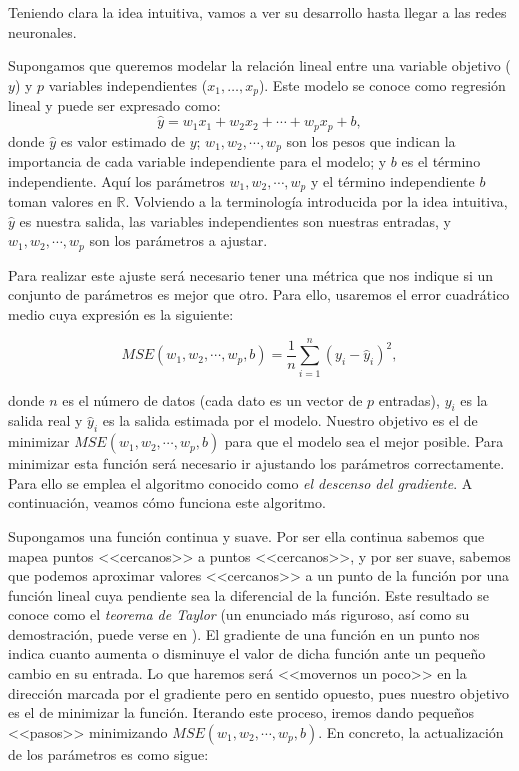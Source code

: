\documentclass[12pt, a4paper, twoside]{book}
\numberwithin{equation}{section}
\theoremstyle{definition}
\theoremstyle{remark}
\theoremstyle{plain}
\begin{document}
	Teniendo clara la idea intuitiva, vamos a ver su desarrollo hasta 
	llegar a las redes neuronales.

	Supongamos que queremos modelar la relación lineal entre una variable
	objetivo ($y$) y $p$ variables independientes ($x_{1},\dots,x_{p}$). 
	Este modelo se conoce como regresión lineal y puede ser expresado 
	como:
	\begin{equation*}
		\hat{y}=w_{1}x_{1}+w_{2}x_{2}+\cdots+w_{p}x_{p}+b,
	\end{equation*}
	donde $\hat{y}$ es valor estimado de $y$; $w_{1},w_{2},\cdots,w_{p}$ 
	son los pesos que indican la importancia de cada variable 
	independiente para el modelo; y $b$ es el término independiente. Aquí 
	los parámetros $w_{1},w_{2},\cdots,w_{p}$ y el término independiente 
	$b$ toman valores en $\mathbb{R}$.
	Volviendo a la terminología introducida por la idea intuitiva, 
	$\hat{y}$ es nuestra salida, las 
	variables independientes son nuestras entradas, y $w_{1},w_{2},\cdots,
	w_{p}$ son los parámetros a ajustar. 

	Para realizar este ajuste será necesario tener una métrica que nos 
	indique si un conjunto de parámetros es mejor que otro. Para ello,
	usaremos el error cuadrático medio cuya expresión es la siguiente:

	\begin{equation*}
		MSE(w_{1},w_{2},\cdots,w_{p},b)=\frac{1}{n}\sum_{i=1}^{n}(y_{i}-\hat{y}_{i})^2,
	\end{equation*}

	\noindent donde $n$ es el número de datos (cada dato es un vector de $p$ 
	entradas), $y_{i}$ es la salida real y 
	$\hat{y}_{i}$ es la salida estimada por el modelo. Nuestro objetivo
	es el de minimizar $MSE(w_{1},w_{2},\cdots,w_{p},b)$ para que el modelo 
	sea el mejor posible. 
	Para minimizar esta función será necesario ir ajustando los parámetros 
	correctamente. Para ello se emplea el algoritmo conocido como 
	\emph{el descenso del gradiente}. A continuación, veamos cómo funciona 
	este algoritmo.

	Supongamos una función continua y suave. Por ser ella continua sabemos
	que mapea puntos <<cercanos>> a puntos <<cercanos>>, y por ser suave,
	sabemos que podemos aproximar valores <<cercanos>> a un punto de la 
	función por una función lineal cuya pendiente sea la diferencial de la 
	función. Este resultado se conoce como el \emph{teorema de Taylor} (un 
	enunciado más riguroso, así como su demostración, puede verse en 
	\cite{Diferencial-Bello}). El gradiente de una función en un punto 
	nos indica cuanto aumenta o disminuye el valor 
	de dicha función ante un pequeño cambio en su entrada. Lo que haremos 
	será <<movernos un poco>> en la dirección marcada por el gradiente 
	pero en sentido opuesto, pues nuestro objetivo 
	es el de minimizar la función. Iterando este proceso,
	iremos dando pequeños <<pasos>> minimizando $MSE(w_{1},w_{2},\cdots,
	w_{p},b)$. En concreto, la 
	actualización de los parámetros es como sigue:
	
\end{document}
